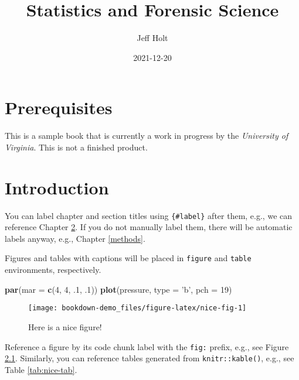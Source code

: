 \documentclass[
]{book}
\title{Statistics and Forensic Science}
\author{Jeff Holt}
\date{2021-12-20}
\newenvironment{Shaded}{\begin{snugshade}}{\end{snugshade}}
\newcommand{\DataTypeTok}[1]{\textcolor[rgb]{0.13,0.29,0.53}{#1}}
\newcommand{\DecValTok}[1]{\textcolor[rgb]{0.00,0.00,0.81}{#1}}
\newcommand{\FloatTok}[1]{\textcolor[rgb]{0.00,0.00,0.81}{#1}}
\newcommand{\KeywordTok}[1]{\textcolor[rgb]{0.13,0.29,0.53}{\textbf{#1}}}
\newcommand{\NormalTok}[1]{#1}
\newcommand{\StringTok}[1]{\textcolor[rgb]{0.31,0.60,0.02}{#1}}
\begin{document}
\maketitle

{
\setcounter{tocdepth}{1}
\tableofcontents
}
\hypertarget{prerequisites}{%
\chapter{Prerequisites}\label{prerequisites}}

This is a sample book that is currently a work in progress by the \emph{University of Virginia}. This is not a finished product.

\hypertarget{intro}{%
\chapter{Introduction}\label{intro}}

You can label chapter and section titles using \texttt{\{\#label\}} after them, e.g., we can reference Chapter \ref{intro}. If you do not manually label them, there will be automatic labels anyway, e.g., Chapter \ref{methods}.

Figures and tables with captions will be placed in \texttt{figure} and \texttt{table} environments, respectively.

\begin{Shaded}
\begin{Highlighting}[]
\KeywordTok{par}\NormalTok{(}\DataTypeTok{mar =} \KeywordTok{c}\NormalTok{(}\DecValTok{4}\NormalTok{, }\DecValTok{4}\NormalTok{, }\FloatTok{.1}\NormalTok{, }\FloatTok{.1}\NormalTok{))}
\KeywordTok{plot}\NormalTok{(pressure, }\DataTypeTok{type =} \StringTok{'b'}\NormalTok{, }\DataTypeTok{pch =} \DecValTok{19}\NormalTok{)}
\end{Highlighting}
\end{Shaded}

\begin{figure}

{\centering \texttt{[image: bookdown-demo\_files/figure-latex/nice-fig-1]} 

}

\caption{Here is a nice figure!}\label{fig:nice-fig}
\end{figure}

Reference a figure by its code chunk label with the \texttt{fig:} prefix, e.g., see Figure \ref{fig:nice-fig}. Similarly, you can reference tables generated from \texttt{knitr::kable()}, e.g., see Table \ref{tab:nice-tab}.
\end{document}
